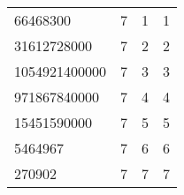 \begin{table}[H]
\begin{tabular}{llll}
66468300                                    & 7                                      & 1                                      & 1                                            \\
31612728000                                 & 7                                      & 2                                      & 2                                            \\
1054921400000                               & 7                                      & 3                                      & 3                                            \\
971867840000                                & 7                                      & 4                                      & 4                                            \\
15451590000                                 & 7                                      & 5                                      & 5                                            \\
5464967                                     & 7                                      & 6                                      & 6                                            \\
270902                                      & 7                                      & 7                                      & 7                                           
\end{tabular}
\end{table}

